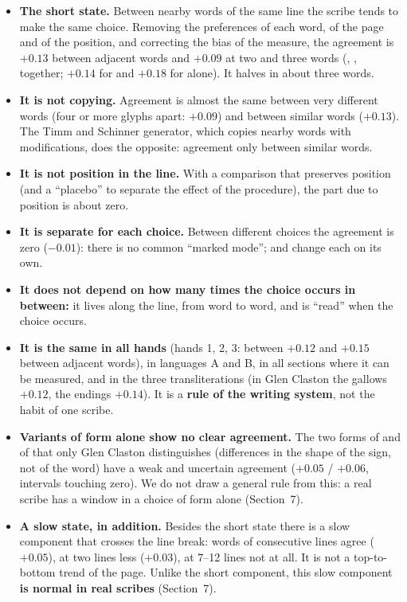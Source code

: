 \begin{itemize}
\item \textbf{The short state.} Between nearby words of the same line the scribe tends to make the same choice. Removing
  the preferences of each word, of the page and of the position, and correcting the bias of the measure, the agreement is
  $+0.13$ between adjacent words and $+0.09$ at two and three words (, ,  together;
  $+0.14$ for  and $+0.18$ for  alone). It halves in about three words.
\item \textbf{It is not copying.} Agreement is almost the same between very different words (four or more glyphs apart:
  $+0.09$) and between similar words ($+0.13$). The Timm and Schinner generator, which copies nearby words with
  modifications, does the opposite: agreement only between similar words.
\item \textbf{It is not position in the line.} With a comparison that preserves position (and a ``placebo'' to separate the
  effect of the procedure), the part due to position is about zero.
\item \textbf{It is separate for each choice.} Between different choices the agreement is zero ($-0.01$): there is no
  common ``marked mode'';  and  change each on its own.
\item \textbf{It does not depend on how many times the choice occurs in between:} it lives along the line, from word to
  word, and is ``read'' when the choice occurs.
\item \textbf{It is the same in all hands} (hands 1, 2, 3: between $+0.12$ and $+0.15$ between adjacent words), in
  languages A and B, in all sections where it can be measured, and in the three transliterations (in Glen Claston the
  gallows $+0.12$, the endings $+0.14$). It is a \textbf{rule of the writing system}, not the habit of one scribe.
\item \textbf{Variants of form alone show no clear agreement.} The two forms of  and of  that only Glen
  Claston distinguishes (differences in the shape of the sign, not of the word) have a weak and uncertain agreement
  ($+0.05$ / $+0.06$, intervals touching zero). We do not draw a general rule from this: a real scribe has a window in a
  choice of form alone (Section~7).
\item \textbf{A slow state, in addition.} Besides the short state there is a slow component that crosses the line break:
  words of consecutive lines agree ($+0.05$), at two lines less ($+0.03$), at 7--12 lines not at all. It is not a
  top-to-bottom trend of the page. Unlike the short component, this slow component \textbf{is normal in real scribes}
  (Section~7).
\end{itemize}

